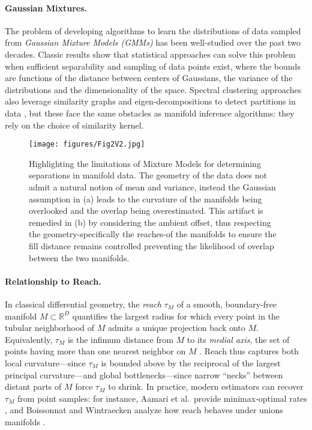 \documentclass{article}
\theoremstyle{plain}
\theoremstyle{definition}
\theoremstyle{remark}
\begin{document}
\paragraph{Gaussian Mixtures.}
The problem of developing algorithms to learn the distributions of data sampled from \emph{Gaussian Mixture Models (GMMs)} has been well-studied over the past two decades. Classic results show that statistical approaches can solve this problem when sufficient separability and sampling of data points exist, where the bounds are functions of the distance between centers of Gaussians, the variance of the distributions and the dimensionality of the space. \citet{aroraLearningMixturesSeparated2005, vempalaSpectralAlgorithmLearning2004} Spectral clustering approaches also leverage similarity graphs and eigen-decompositions to detect partitions in data \citet{luxburgTutorialSpectralClustering2007}, but these face the same obstacles as manifold inference algorithms: they rely on the choice of similarity kernel.

\begin{figure}[t]
    \centering
    \texttt{[image: figures/Fig2V2.jpg]}
    \caption{Highlighting the limitations of Mixture Models for determining separations in manifold data. The geometry of the data does not admit a natural notion of mean and variance, instead the Gaussian assumption in (a) leads to the curvature of the manifolds being overlooked and the overlap being overestimated. This artifact is remedied in (b) by considering the ambient offset, thus respecting the geometry-specifically the reaches-of the manifolds to ensure the fill distance remains controlled preventing the likelihood of overlap between the two manifolds.}
    \label{fig:manifold_convergence}
\end{figure}

\paragraph{Relationship to Reach.}
In classical differential geometry, the \emph{reach} \(\tau_M\) of a smooth, boundary‑free manifold \(M\subset\mathbb{R}^D\) quantifies the largest radius for which every point in the tubular neighborhood of \(M\) admits a unique projection back onto \(M\).  Equivalently, \(\tau_M\) is the infimum distance from \(M\) to its \emph{medial axis}, the set of points having more than one nearest neighbor on \(M\) \cite{feffermanReconstructionInterpolationManifolds2020}.  Reach thus captures both local curvature—since \(\tau_M\) is bounded above by the reciprocal of the largest principal curvature—and global bottlenecks—since narrow “necks” between distant parts of \(M\) force \(\tau_M\) to shrink.  In practice, modern estimators can recover \(\tau_M\) from point samples: for instance, Aamari et al.\ provide minimax‑optimal rates \cite{aamari2019estimating}, and Boissonnat and Wintraecken analyze how reach behaves under unions manifolds \cite{boissonnat2023reach}.
\end{document}
